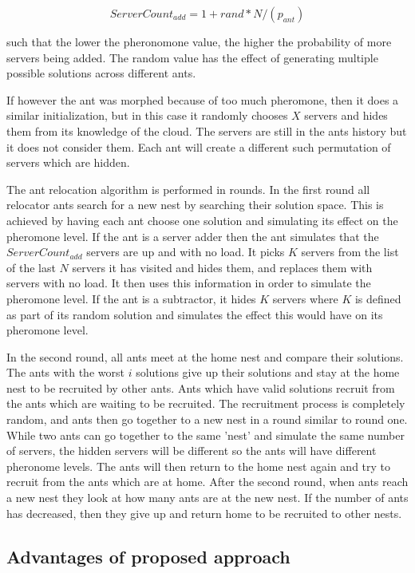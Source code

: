 \documentclass{sig-alternate}
\begin{document}
\begin{equation}
ServerCount_{add} = 1 + rand * N / (p_{ant})
\end{equation}

such that the lower the pheronomone value, the higher the probability of more servers being added. The random value has the effect of generating multiple possible solutions across different ants.

If however the ant was morphed because of too much pheromone, then it does a similar initialization, but in this case it randomly chooses $X$ servers and hides them from its knowledge of the cloud. The servers are still in the ants history but it does not consider them. Each ant will create a different such permutation of servers which are hidden.

The ant relocation algorithm is performed in rounds. In the first round all relocator ants search for a new nest by searching their solution space. This is achieved by having each ant choose one solution and simulating its effect on the pheromone level. If the ant is a server adder then the ant simulates that the $ServerCount_{add}$ servers are up and with no load. It picks $K$ servers from the list of the last $N$ servers it has visited and hides them, and replaces them with servers with no load. It then uses this information in order to simulate the pheromone level. If the ant is a subtractor, it hides $K$ servers where $K$ is defined as part of its random solution and simulates the effect this would have on its pheromone level.

In the second round, all ants meet at the home nest and compare their solutions. The ants with the worst $i$ solutions give up their solutions and stay at the home nest to be recruited by other ants. Ants which have valid solutions recruit from the ants which are waiting to be recruited. The recruitment process is completely random, and ants then go together to a new nest in a round similar to round one. While two ants can go together to the same 'nest' and simulate the same number of servers, the hidden servers will be different so the ants will have different pheronome levels. The ants will then return to the home nest again and try to recruit from the ants which are at home. After the second round, when ants reach a new nest they look at how many ants are at the new nest. If the number of ants has decreased, then they give up and return home to be recruited to other nests.

\subsection{Advantages of proposed approach}
\end{document}
